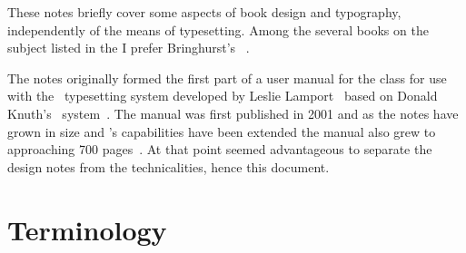 \documentclass[10pt,a4paper,oneside,extrafontsizes]{memoir}%
\begin{document}
\begin{paracol}{2}
\switchEng
    These notes briefly cover some aspects of book design and typography, 
independently of the means of typesetting. Among
the several books on the subject listed in the \bibname{} I prefer
Bringhurst's ~\autocite{BRINGHURST99}.

\switchEng
    The notes originally formed the first part of a user manual for
the  class for 
use with the \ltx\ typesetting system developed by Leslie 
Lamport~\autocite{LAMPORT94} based 
on Donald Knuth's \tx\ system~\autocite{TEXBOOK}. 
The manual was first published in 2001
and as the notes have grown in size and 's capabilities 
have been extended the manual also grew to approaching 700 pages~\autocite{MEMMAN}. 
At that point seemed advantageous to separate the design notes from the 
technicalities, hence this document.

\end{paracol}


\chapter{Terminology}
\end{document}

